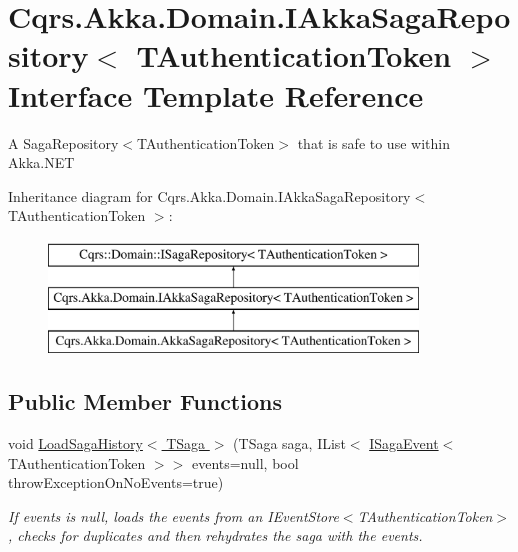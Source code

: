 \hypertarget{interfaceCqrs_1_1Akka_1_1Domain_1_1IAkkaSagaRepository}{}\section{Cqrs.\+Akka.\+Domain.\+I\+Akka\+Saga\+Repository$<$ T\+Authentication\+Token $>$ Interface Template Reference}
\label{interfaceCqrs_1_1Akka_1_1Domain_1_1IAkkaSagaRepository}


A Saga\+Repository$<$\+T\+Authentication\+Token$>$ that is safe to use within Akka.\+N\+ET  


Inheritance diagram for Cqrs.\+Akka.\+Domain.\+I\+Akka\+Saga\+Repository$<$ T\+Authentication\+Token $>$\+:\begin{figure}[H]
\begin{center}
\leavevmode
\includegraphics[height=3.000000cm]{interfaceCqrs_1_1Akka_1_1Domain_1_1IAkkaSagaRepository}
\end{center}
\end{figure}
\subsection*{Public Member Functions}
\begin{DoxyCompactItemize}
\item 
void \hyperlink{interfaceCqrs_1_1Akka_1_1Domain_1_1IAkkaSagaRepository_a77233d8c2230c0a69a993faaac0101a9_a77233d8c2230c0a69a993faaac0101a9}{Load\+Saga\+History$<$ T\+Saga $>$} (T\+Saga saga, I\+List$<$ \hyperlink{interfaceCqrs_1_1Events_1_1ISagaEvent}{I\+Saga\+Event}$<$ T\+Authentication\+Token $>$$>$ events=null, bool throw\+Exception\+On\+No\+Events=true)
\begin{DoxyCompactList}\small\item\em If {\itshape events}  is null, loads the events from an I\+Event\+Store$<$\+T\+Authentication\+Token$>$, checks for duplicates and then rehydrates the {\itshape saga}  with the events. \end{DoxyCompactList}\end{DoxyCompactItemize}


